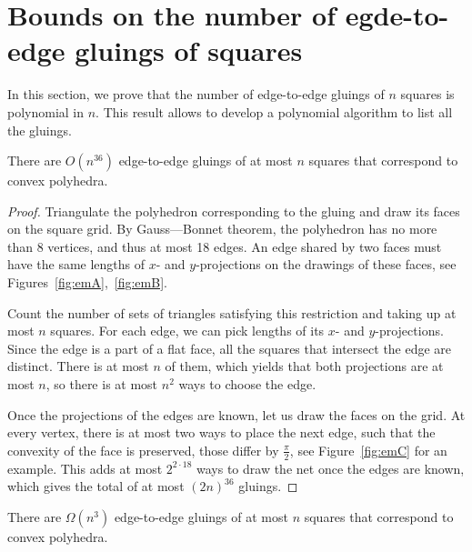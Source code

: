 \documentclass[a4paper,11pt]{article}
\begin{document}
\section{Bounds on the number of egde-to-edge gluings of squares}

In this section, we prove that the number of edge-to-edge gluings of $n$ squares is polynomial in $n$. This result allows to develop a polynomial algorithm to list all the gluings.

\begin{theorem} \label{thm:n36}
	There are $O \left( n^{36} \right)$ edge-to-edge gluings of at most $n$ squares that correspond to convex polyhedra.
\end{theorem}

\begin{proof}
	Triangulate the polyhedron corresponding to the gluing and draw its faces on the square grid. By Gauss—Bonnet theorem, the polyhedron has no more than 8 vertices, and thus at most 18 edges. An edge shared by two faces must have the same lengths of $x$- and $y$-projections on the drawings of these faces, see Figures~\ref{fig:emA},~\ref{fig:emB}.



Count the number of sets of triangles satisfying this restriction and taking up at most $n$ squares. For each edge, we can pick lengths of its $x$- and $y$-projections. Since the edge is a part of a flat face, all the squares that intersect the edge are distinct. There is at most $n$ of them, which yields that both projections are at most $n$, so there is at most $n^2$ ways to choose the edge.

Once the projections of the edges are known, let us draw the faces on the grid. At every vertex, there is at most two ways to place the next edge, such that the convexity of the face is preserved, those differ by $\frac{\pi}{2}$, see Figure~\ref{fig:emC} for an example. This adds at most $2^{2 \cdot 18}$ ways to draw the net once the edges are known, which gives the total of at most $(2n)^{36}$ gluings.
\end{proof}

\begin{theorem} \label{thm:n3}
	There are $\Omega \left( n^3 \right)$ edge-to-edge gluings of at most $n$ squares that correspond to convex polyhedra.
\end{theorem}
\end{document}
